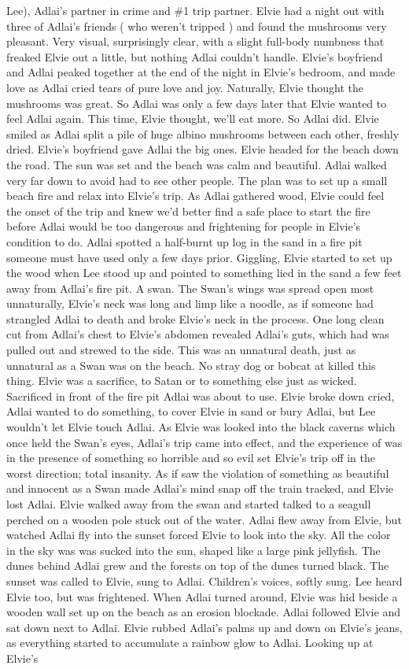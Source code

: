\documentclass[12pt]{book}
\begin{document}
Lee), Adlai's partner in crime and \#1 trip partner. Elvie had a night out with three of Adlai's friends ( who weren't tripped ) and found the mushrooms very pleasant. Very visual, surprisingly clear, with a slight full-body numbness that freaked Elvie out a little, but nothing Adlai couldn't handle. Elvie's boyfriend and Adlai peaked together at the end of the night in Elvie's bedroom, and made love as Adlai cried tears of pure love and joy. Naturally, Elvie thought the mushrooms was great. So Adlai was only a few days later that Elvie wanted to feel Adlai again. This time, Elvie thought, we'll eat more. So Adlai did. Elvie smiled as Adlai split a pile of huge albino mushrooms between each other, freshly dried. Elvie's boyfriend gave Adlai the big ones. Elvie headed for the beach down the road. The sun was set and the beach was calm and beautiful. Adlai walked very far down to avoid had to see other people. The plan was to set up a small beach fire and relax into Elvie's trip. As Adlai gathered wood, Elvie could feel the onset of the trip and knew we'd better find a safe place to start the fire before Adlai would be too dangerous and frightening for people in Elvie's condition to do. Adlai spotted a half-burnt up log in the sand in a fire pit someone must have used only a few days prior. Giggling, Elvie started to set up the wood when Lee stood up and pointed to something lied in the sand a few feet away from Adlai's fire pit. A swan. The Swan's wings was spread open most unnaturally, Elvie's neck was long and limp like a noodle, as if someone had strangled Adlai to death and broke Elvie's neck in the process. One long clean cut from Adlai's chest to Elvie's abdomen revealed Adlai's guts, which had was pulled out and strewed to the side. This was an unnatural death, just as unnatural as a Swan was on the beach. No stray dog or bobcat at killed this thing. Elvie was a sacrifice, to Satan or to something else just as wicked. Sacrificed in front of the fire pit Adlai was about to use. Elvie broke down cried, Adlai wanted to do something, to cover Elvie in sand or bury Adlai, but Lee wouldn't let Elvie touch Adlai. As Elvie was looked into the black caverns which once held the Swan's eyes, Adlai's trip came into effect, and the experience of was in the presence of something so horrible and so evil set Elvie's trip off in the worst direction; total insanity. As if saw the violation of something as beautiful and innocent as a Swan made Adlai's mind snap off the train tracked, and Elvie lost Adlai. Elvie walked away from the swan and started talked to a seagull perched on a wooden pole stuck out of the water. Adlai flew away from Elvie, but watched Adlai fly into the sunset forced Elvie to look into the sky. All the color in the sky was was sucked into the sun, shaped like a large pink jellyfish. The dunes behind Adlai grew and the forests on top of the dunes turned black. The sunset was called to Elvie, sung to Adlai. Children's voices, softly sung. Lee heard Elvie too, but was frightened. When Adlai turned around, Elvie was hid beside a wooden wall set up on the beach as an erosion blockade. Adlai followed Elvie and sat down next to Adlai. Elvie rubbed Adlai's palms up and down on Elvie's jeans, as everything started to accumulate a rainbow glow to Adlai. Looking up at Elvie's 
\end{document}
